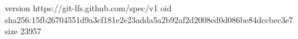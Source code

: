 version https://git-lfs.github.com/spec/v1
oid sha256:15fb26704551d9a3cf181e2e23adda5a2b92af2d2008ed0d086be84dccbec3e7
size 23957
